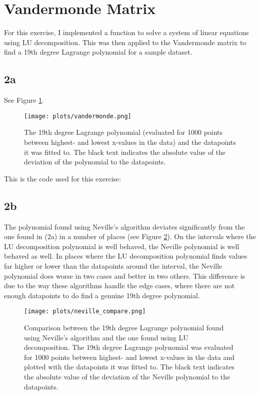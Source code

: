 \section{Vandermonde Matrix}
For this exercise, I implemented a function to solve a system of linear equations
using LU decomposition. This was then applied to the Vandermonde matrix to
find a 19th degree Lagrange polynomial for a sample dataset.

\subsection*{2a}
See Figure \ref{fig:vandermonde}.
\begin{figure}
    \centering
    \texttt{[image: plots/vandermonde.png]}
    \caption{The 19th degree Lagrange polynomial (evaluated for 1000 points 
    between highest- and lowest x-values in the data) and the datapoints it 
    was fitted to. The black text indicates the absolute value of the 
    deviation of the polynomial to the datapoints.}
    \label{fig:vandermonde}
\end{figure}

\noindent
This is the code used for this exercise:


\subsection*{2b}
The polynomial found using Neville's algorithm deviates significantly
from the one found in (2a) in a number of places (see Figure \ref{fig:neville}). 
On the intervals where the LU decomposition polynomial is well behaved, the 
Neville polynomial is well behaved as well. In places where the LU 
decomposition polynomial finds values far higher or lower than the 
datapoints around the interval, the Neville polynomial does worse in two 
cases and better in two others. This difference is due to the way these 
algorithms handle the edge cases, where there are not enough datapoints to 
do find a genuine 19th degree polynomial.

\begin{figure}
    \centering
    \texttt{[image: plots/neville\_compare.png]}
    \caption{Comparison between the 19th degree Lagrange polynomial found
    using Neville's algorithm and the one found using LU decomposition. The 
    19th degree Lagrange polynomial was evaluated for 1000 points between 
    highest- and lowest x-values in the data and plotted with the datapoints 
    it was fitted to. The black text indicates the absolute value of the 
    deviation of the Neville polynomial to the datapoints.}
    \label{fig:neville}
\end{figure}


